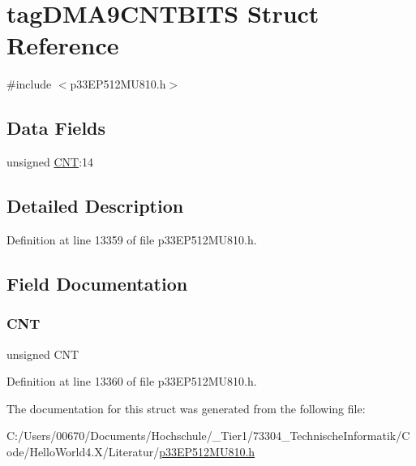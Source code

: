 \hypertarget{structtag_d_m_a9_c_n_t_b_i_t_s}{}\section{tag\+D\+M\+A9\+C\+N\+T\+B\+I\+TS Struct Reference}
\label{structtag_d_m_a9_c_n_t_b_i_t_s}


{\ttfamily \#include $<$p33\+E\+P512\+M\+U810.\+h$>$}

\subsection*{Data Fields}
\begin{DoxyCompactItemize}
\item 
unsigned \hyperlink{structtag_d_m_a9_c_n_t_b_i_t_s_a30be39d82c244f19fd98dd74227487f6}{C\+NT}\+:14
\end{DoxyCompactItemize}


\subsection{Detailed Description}


Definition at line 13359 of file p33\+E\+P512\+M\+U810.\+h.



\subsection{Field Documentation}
\mbox{\label{structtag_d_m_a9_c_n_t_b_i_t_s_a30be39d82c244f19fd98dd74227487f6}} 
\subsubsection{\texorpdfstring{C\+NT}{CNT}}
{\footnotesize\ttfamily unsigned C\+NT}



Definition at line 13360 of file p33\+E\+P512\+M\+U810.\+h.



The documentation for this struct was generated from the following file\+:\begin{DoxyCompactItemize}
\item 
C\+:/\+Users/00670/\+Documents/\+Hochschule/\+\_\+\+Tier1/73304\+\_\+\+Technische\+Informatik/\+Code/\+Hello\+World4.\+X/\+Literatur/\hyperlink{p33_e_p512_m_u810_8h}{p33\+E\+P512\+M\+U810.\+h}\end{DoxyCompactItemize}
